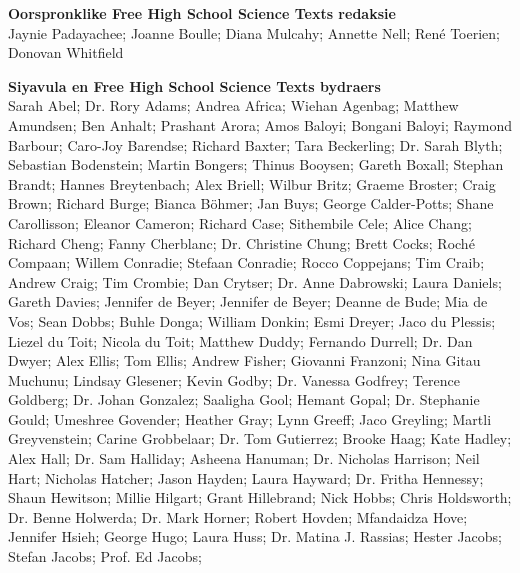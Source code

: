 \textbf{\Large Oorspronklike Free High School Science Texts redaksie}\\

Jaynie Padayachee; Joanne Boulle; Diana Mulcahy; Annette Nell; René Toerien; Donovan Whitfield \par

\textbf{\Large Siyavula en Free High School Science Texts bydraers}\\

    Sarah Abel;
Dr. Rory Adams;
    Andrea Africa;
    Wiehan Agenbag;
    Matthew Amundsen;
    Ben Anhalt;
    Prashant Arora;
    Amos Baloyi;
    Bongani Baloyi;
    Raymond Barbour;
    Caro-Joy Barendse;
    Richard Baxter;
    Tara Beckerling;
Dr. Sarah Blyth;
    Sebastian Bodenstein;
    Martin Bongers;
    Thinus Booysen;
    Gareth Boxall;
    Stephan Brandt;
    Hannes Breytenbach;
    Alex Briell;
    Wilbur Britz;
    Graeme Broster;
    Craig Brown;
    Richard Burge;
    Bianca Böhmer;
    Jan Buys;
    George Calder-Potts;
    Shane Carollisson;
    Eleanor Cameron;
    Richard Case;
    Sithembile Cele;
    Alice Chang;
    Richard Cheng;
    Fanny Cherblanc;
Dr. Christine Chung;
    Brett Cocks;
    Roch\'{e} Compaan;
    Willem Conradie;
    Stefaan Conradie;
    Rocco Coppejans;
    Tim Craib;
    Andrew Craig;
    Tim Crombie;
    Dan Crytser;
Dr. Anne Dabrowski;
    Laura Daniels;
    Gareth Davies;
    Jennifer de Beyer;
    Jennifer de Beyer;
    Deanne de Bude;
    Mia de Vos;
    Sean Dobbs;
    Buhle Donga;
    William Donkin;
    Esmi Dreyer;
    Jaco du Plessis;
    Liezel du Toit;
    Nicola du Toit;
    Matthew Duddy;
    Fernando Durrell;
Dr. Dan Dwyer;
    Alex Ellis;
    Tom Ellis;
    Andrew Fisher;
    Giovanni Franzoni;
    Nina Gitau Muchunu;
    Lindsay Glesener;
    Kevin Godby;
Dr. Vanessa Godfrey;
    Terence Goldberg;
Dr. Johan Gonzalez;
    Saaligha Gool;
    Hemant Gopal;
Dr. Stephanie Gould;
    Umeshree Govender;
    Heather Gray;
    Lynn Greeff;
    Jaco Greyling;
    Martli Greyvenstein;
    Carine Grobbelaar;
Dr. Tom Gutierrez;
    Brooke Haag;
    Kate Hadley;
    Alex Hall;
Dr. Sam Halliday;
    Asheena Hanuman;
Dr. Nicholas Harrison;
    Neil Hart;
    Nicholas Hatcher;
    Jason Hayden;
    Laura Hayward;
Dr. Fritha Hennessy;
    Shaun Hewitson;
    Millie Hilgart;
    Grant Hillebrand;
    Nick Hobbs;
    Chris Holdsworth;
Dr. Benne Holwerda;
Dr. Mark Horner;
    Robert Hovden;
    Mfandaidza Hove;
    Jennifer Hsieh;
    George Hugo;
    Laura Huss;
Dr. Matina J. Rassias;
    Hester Jacobs;
    Stefan Jacobs;
Prof. Ed Jacobs;
